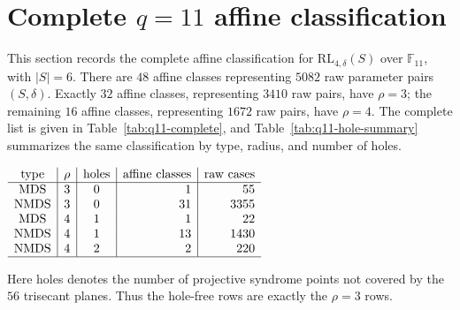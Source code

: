 ﻿\documentclass[11pt]{article}
\newcommand{\F}{\mathbb F}
\newcommand{\RL}{\mathrm{RL}}
\theoremstyle{plain}
\theoremstyle{definition}
\begin{document}
\section{Complete \texorpdfstring{\(q=11\)}{q=11} affine classification}
\label{sec:q11-complete}

This section records the complete affine classification for
\(\RL_{4,\delta}(S)\) over \(\F_{11}\), with \(|S|=6\).  There are \(48\)
affine classes representing \(5082\) raw parameter pairs \((S,\delta)\).
Exactly \(32\) affine classes, representing \(3410\) raw pairs, have
\(\rho=3\); the remaining \(16\) affine classes, representing \(1672\) raw
pairs, have \(\rho=4\).  The complete list is given in
Table~\ref{tab:q11-complete}, and Table~\ref{tab:q11-hole-summary}
summarizes the same classification by type, radius, and number of holes.

\begin{center}
\label{tab:q11-hole-summary}
\(
\begin{array}{c|c|c|r|r}
\hbox{type} & \rho & \hbox{holes} & \hbox{affine classes} & \hbox{raw cases}\\
\hline
\mathrm{MDS}  & 3 & 0 & 1  & 55\\
\mathrm{NMDS} & 3 & 0 & 31 & 3355\\
\mathrm{MDS}  & 4 & 1 & 1  & 22\\
\mathrm{NMDS} & 4 & 1 & 13 & 1430\\
\mathrm{NMDS} & 4 & 2 & 2  & 220\\
\hline
\end{array}
\)
\end{center}

Here holes denotes the number of projective syndrome points not covered by
the \(56\) trisecant planes.  Thus the hole-free rows are exactly the
\(\rho=3\) rows.
\end{document}
